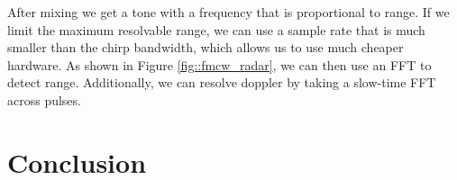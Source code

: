 \documentclass{article}
\begin{document}
\noindent After mixing we get a tone with a frequency that is proportional to range. If we limit the maximum resolvable range, we can use a sample rate that is much smaller than the chirp bandwidth, which allows us to use much cheaper hardware. As shown in Figure \ref{fig::fmcw_radar}, we can then use an FFT to detect range. Additionally, we can resolve doppler by taking a slow-time FFT across pulses.

\section{Conclusion}


{}
\end{document}
